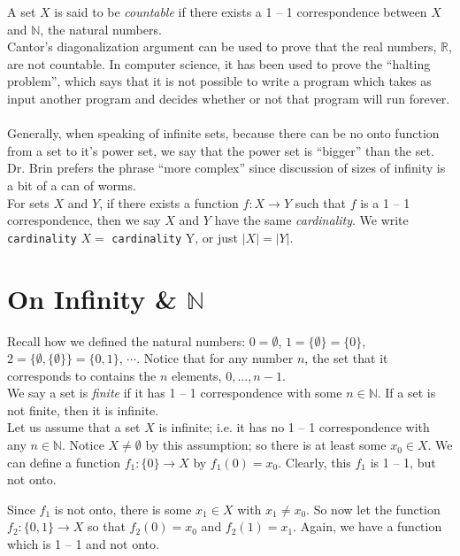 \documentclass[12pt]{report}
\newcommand{\define}{  \noindent{\sc Definition }\hspace{5pt} }
\newcommand{\reals}{\mathbb{R}}
\newcommand{\naturals}{\mathbb{N}}
\begin{document}
\define A set $X$ is said to be  {\em countable} if 
there exists a 1 -- 1 correspondence between $X$ and $\naturals$, the natural
numbers.\\

Cantor's diagonalization argument can be used to prove that the real numbers,
$\reals$, are not countable. In computer science, it has been used to prove the
``halting problem'', which says that it is not possible to write a program
which takes as input another program and decides whether or not that program
will run forever.\\
\\

Generally, when speaking of infinite sets, because there can be no onto
function from a set to it's power set, we say that the power set is ``bigger''
than the set. Dr. Brin prefers the phrase ``more complex'' since discussion of
sizes of infinity is a bit of a can of worms.\\

\define For sets $X$ and $Y$, if there exists a function $f:X\rightarrow Y$
such that $f$ is a 1 -- 1 correspondence, then we say $X$ and $Y$ have the
same  {\em cardinality}. We write {\tt cardinality} $X =$
{\tt cardinality} Y, or just $|X| = |Y|$.\\

\section{On Infinity \& $\naturals$}

Recall how we defined the natural numbers: $0 = \emptyset$, $1 =
\{\emptyset\} = \{0\}$, $2 = \{\emptyset, \{\emptyset\}\} = \{0,1\}$, $\cdots$.
Notice that for any number $n$, the set that it corresponds to contains the
$n$ elements, $0, ..., n - 1$.\\

\define We say a set is  {\em finite} if it has 1 -- 1
correspondence with some $n \in \naturals$. If a set is not finite, then it is
infinite.\\

Let us assume that a set $X$ is infinite; i.e. it has no 1 -- 1 correspondence
with any $n \in \naturals$. Notice $X \neq \emptyset$ by this assumption; so
there is at least some $x_0 \in X$. We can define a function 
$f_1:\{0\}\rightarrow X$ by $f_1(0) = x_0$. Clearly, this $f_1$ is
1 -- 1, but not onto. 

Since $f_1$ is not onto, there is some $x_1 \in X$ with $x_1 \neq x_0$. So now
let the function $f_2:\{0,1\}\rightarrow X$ so that $f_2(0)=x_0$ and $f_2(1) =
x_1$. Again, we have a function which is 1 -- 1 and not onto.
\end{document}
